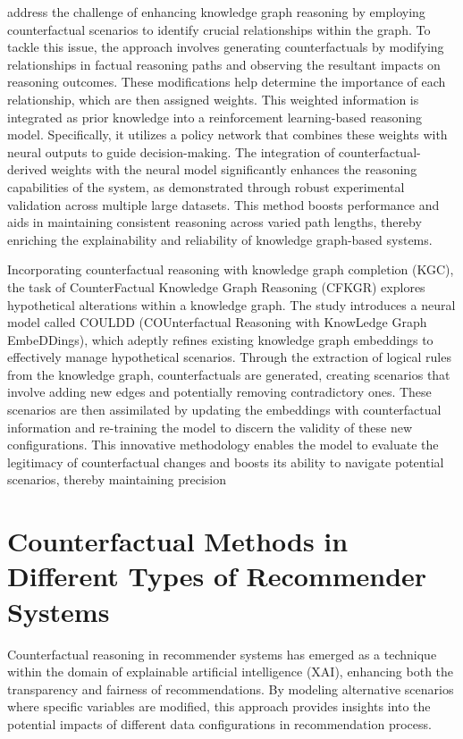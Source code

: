 \textcite{wang_incorporating_2021} address the challenge of enhancing knowledge graph
reasoning by employing counterfactual scenarios to identify crucial relationships
within the graph. To tackle this issue, the approach involves generating counterfactuals
by modifying relationships in factual reasoning paths and observing the resultant
impacts on reasoning outcomes. These modifications help determine the importance
of each relationship, which are then assigned weights. This weighted information
is integrated as prior knowledge into a reinforcement learning-based reasoning
model. Specifically, it utilizes a policy network that combines these weights
with neural outputs to guide decision-making. The integration of counterfactual-derived
weights with the neural model significantly enhances the reasoning capabilities of
the system, as demonstrated through robust experimental validation across
multiple large datasets. This method boosts performance and aids in
maintaining consistent reasoning across varied path lengths, thereby enriching
the explainability and reliability of knowledge graph-based systems.

Incorporating counterfactual reasoning with knowledge graph completion (KGC), the
task of CounterFactual Knowledge Graph Reasoning (CFKGR) explores hypothetical alterations
within a knowledge graph. The study introduces a neural model called COULDD (COUnterfactual
Reasoning with KnowLedge Graph EmbeDDings), which adeptly refines existing knowledge
graph embeddings to effectively manage hypothetical scenarios. Through the
extraction of logical rules from the knowledge graph, counterfactuals are generated,
creating scenarios that involve adding new edges and potentially removing
contradictory ones. These scenarios are then assimilated by updating the embeddings
with counterfactual information and re-training the model to discern the validity
of these new configurations. This innovative methodology enables the
model to evaluate the legitimacy of counterfactual changes and boosts its
ability to navigate potential scenarios, thereby maintaining precision \parencite{zellinger_counterfactual_2024}

\section{Counterfactual Methods in Different Types of Recommender Systems}

Counterfactual reasoning in recommender systems has emerged as a
technique within the domain of explainable artificial intelligence (XAI), enhancing
both the transparency and fairness of recommendations. By modeling alternative
scenarios where specific variables are modified, this approach provides insights
into the potential impacts of different data configurations in recommendation process.

